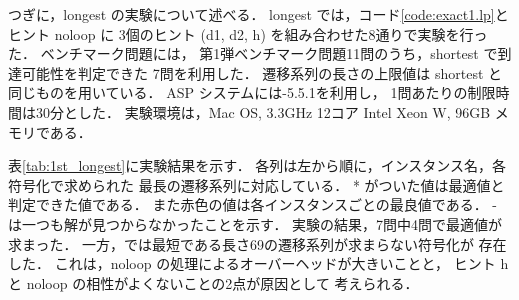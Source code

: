 つぎに，longest の実験について述べる．
longest では，コード\ref{code:exact1.lp}とヒント noloop に
3個のヒント (d1, d2, h) を組み合わせた8通りで実験を行った．
ベンチマーク問題には，%
第1弾ベンチマーク問題11問のうち，shortest で到達可能性を判定できた
7問を利用した．
遷移系列の長さの上限値は shortest と同じものを用いている．
ASP システムには{\clingo}-5.5.1を利用し，
1問あたりの制限時間は30分とした．
実験環境は，Mac OS, 3.3GHz 12コア Intel Xeon W, 96GB メモリである．

表\ref{tab:1st_longest}に実験結果を示す．
各列は左から順に，インスタンス名，各符号化で求められた
最長の遷移系列に対応している．
* がついた値は最適値と判定できた値である．
また赤色の値は各インスタンスごとの最良値である．
- は一つも解が見つからなかったことを示す．
実験の結果，7問中4問で最適値が求まった．
一方，では最短である長さ69の遷移系列が求まらない符号化が
存在した．
これは，noloop の処理によるオーバーヘッドが大きいことと，
ヒント h と noloop の相性がよくないことの2点が原因として
考えられる．
